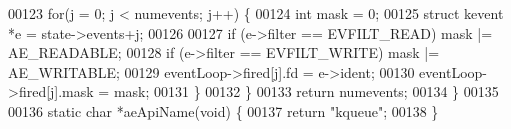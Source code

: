 \begin{DoxyCode}
00123         \textcolor{keywordflow}{for}(j = 0; j < numevents; j++) \{
00124             \textcolor{keywordtype}{int} mask = 0;
00125             \textcolor{keyword}{struct} kevent *e = state->events+j;
00126 
00127             \textcolor{keywordflow}{if} (e->filter == EVFILT\_READ) mask |= AE\_READABLE;
00128             \textcolor{keywordflow}{if} (e->filter == EVFILT\_WRITE) mask |= AE\_WRITABLE;
00129             eventLoop->fired[j].fd = e->ident;
00130             eventLoop->fired[j].mask = mask;
00131         \}
00132     \}
00133     \textcolor{keywordflow}{return} numevents;
00134 \}
00135 
00136 \textcolor{keyword}{static} \textcolor{keywordtype}{char} *aeApiName(\textcolor{keywordtype}{void}) \{
00137     \textcolor{keywordflow}{return} \textcolor{stringliteral}{"kqueue"};
00138 \}
\end{DoxyCode}
